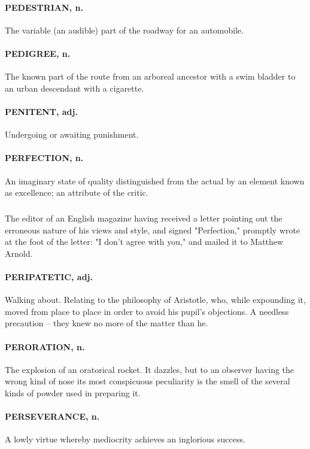 \documentclass[11pt]{article}
\begin{document}
\paragraph{PEDESTRIAN, n.}  The variable (an audible) part of the roadway for an
automobile.

\paragraph{PEDIGREE, n.}  The known part of the route from an arboreal ancestor
with a swim bladder to an urban descendant with a cigarette.

\paragraph{PENITENT, adj.}  Undergoing or awaiting punishment.

\paragraph{PERFECTION, n.}  An imaginary state of quality distinguished from the
actual by an element known as excellence; an attribute of the critic.
\subparagraph{}   The editor of an English magazine having received a letter
pointing out the erroneous nature of his views and style, and signed
"Perfection," promptly wrote at the foot of the letter:  "I don't
agree with you," and mailed it to Matthew Arnold.

\paragraph{PERIPATETIC, adj.}  Walking about.  Relating to the philosophy of
Aristotle, who, while expounding it, moved from place to place in
order to avoid his pupil's objections.  A needless precaution -- they
knew no more of the matter than he.

\paragraph{PERORATION, n.}  The explosion of an oratorical rocket.  It dazzles,
but to an observer having the wrong kind of nose its most conspicuous
peculiarity is the smell of the several kinds of powder used in
preparing it.

\paragraph{PERSEVERANCE, n.}  A lowly virtue whereby mediocrity achieves an
inglorious success.
\end{document}
